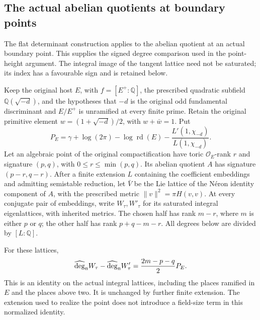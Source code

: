 \subsection{The actual abelian quotients at boundary points}
\label{sec:actual-point-tangent-degrees}

The flat determinant construction applies to the abelian quotient at
an actual boundary point. This supplies the signed degree comparison
used in the point-height argument. The integral image of the tangent
lattice need not be saturated; its index has a favourable sign and is
retained below.

Keep the original host $E$, with $f=[E^+:\mathbb Q]$, the prescribed
quadratic subfield $\mathbb Q(\sqrt{-d})$, and the hypotheses that
$-d$ is the original odd fundamental discriminant and
$E/E^+$ is unramified at every finite prime. Retain the original
primitive element $w=(1+\sqrt{-d})/2$, with $w+\bar w=1$. Put
\[
 P_E=\gamma+\log(2\pi)-\log\operatorname{rd}(E)
             -\frac{L'(1,\chi_{-d})}{L(1,\chi_{-d})}.
\]
Let an algebraic point of the original compactification have toric
$\mathcal O_E$-rank $r$ and signature $(p,q)$, with
$0\le r\le\min(p,q)$. Its abelian quotient $A$ has signature
$(p-r,q-r)$. After a finite extension $L$ containing the coefficient
embeddings and admitting semistable reduction, let $\bar V$ be the
Lie lattice of the N\'eron identity component of $A$, with the
prescribed metric $\|v\|^2=\pi H(v,v)$. At every conjugate pair of
embeddings, write $W_\tau,W'_\tau$ for its saturated integral
eigenlattices, with inherited metrics. The chosen half has rank
$m-r$, where $m$ is either $p$ or $q$; the other half has rank
$p+q-m-r$. All degrees below are divided by $[L:\mathbb Q]$.

\begin{theorem}
\label{thm:actual-point-conjugate-degrees}
For these lattices,
\begin{equation}\label{eq:actual-point-conjugate-degrees}
 \widehat{\deg}_{\rm n}W_\tau-
 \widehat{\deg}_{\rm n}W'_\tau
                    =\frac{2m-p-q}{2}P_E.
\end{equation}
This is an identity on the actual integral lattices, including the
places ramified in $E$ and the places above two. It is unchanged by
further finite extension. The extension used to realize the point
does not introduce a field-size term in this normalized identity.
\end{theorem}

